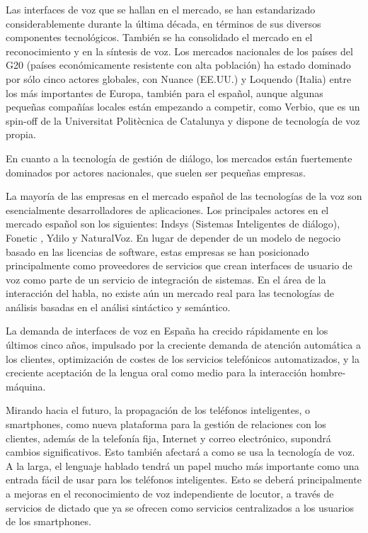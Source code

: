 \begin{multicols}{2}

Las interfaces de voz que se hallan en el mercado, se han estandarizado considerablemente durante la última década, en términos de sus diversos componentes tecnológicos. También se ha consolidado el mercado en el reconocimiento y en la síntesis de voz. Los mercados nacionales de los países del G20 (países económicamente resistente con alta población) ha estado dominado por sólo cinco actores globales, con Nuance (EE.UU.) y Loquendo (Italia) entre los más importantes de Europa, también para el español, aunque algunas pequeñas compañías locales están empezando a competir, como Verbio, que es un spin-off de la Universitat Politècnica de Catalunya y dispone de tecnología de voz propia.

En cuanto a la tecnología de gestión de diálogo, los mercados están fuertemente dominados por actores nacionales, que suelen ser pequeñas empresas.

La mayoría de las empresas en el mercado español de las tecnologías de la voz son esencialmente desarrolladores de aplicaciones. Los principales actores en el mercado español son los siguientes: Indsys (Sistemas Inteligentes de diálogo), Fonetic , Ydilo y NaturalVoz. En lugar de depender de un modelo de negocio basado en las licencias de software, estas empresas se han posicionado principalmente como proveedores de servicios que crean interfaces de usuario de voz como parte de un servicio de integración de sistemas. En el área de la interacción del habla, no existe aún un mercado real para las tecnologías de análisis basadas en el análisi sintáctico y semántico.

La demanda de interfaces de voz en España ha crecido rápidamente en los últimos cinco años, impulsado por la creciente demanda de atención automática a los clientes, optimización de costes de los servicios telefónicos automatizados, y la creciente aceptación de la lengua oral como medio para la interacción hombre-máquina.

Mirando hacia el futuro, la propagación de los teléfonos inteligentes, o smartphones, como nueva plataforma para la gestión de relaciones con los clientes, además de la telefonía fija, Internet y correo electrónico, supondrá cambios significativos. Esto también afectará a como se usa la tecnología de voz. A la larga, el lenguaje hablado tendrá un papel mucho más importante como una entrada fácil de usar para los teléfonos inteligentes. Esto se deberá principalmente a mejoras en el reconocimiento de voz independiente de locutor, a través de servicios de dictado que ya se ofrecen como servicios centralizados a los usuarios de los smartphones. 


\end{multicols}
